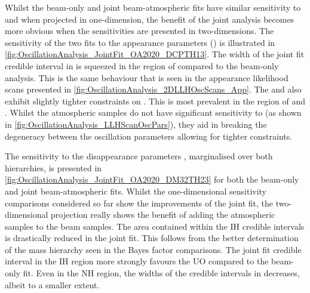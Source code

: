 Whilst the beam-only and joint beam-atmospheric fits have similar sensitivity to  and  when projected in one-dimension, the benefit of the joint analysis becomes more obvious when the sensitivities are presented in two-dimensions. The sensitivity of the two fits to the appearance parameters () is illustrated in \autoref{fig:OscillationAnalysis_JointFit_OA2020_DCPTH13}. The width of the  joint fit credible interval in  is squeezed in the region of  compared to the beam-only analysis. This is the same behaviour that is seen in the appearance likelihood scans presented in \autoref{fig:OscillationAnalysis_2DLLHOscScans_App}. The \quickmath{1\sigma} and  also exhibit slightly tighter constraints on . This is most prevalent in the region of  and . Whilst the atmospheric samples do not have significant sensitivity to  (as shown in \autoref{fig:OscillationAnalysis_LLHScanOscPars}), they aid in breaking the degeneracy between the oscillation parameters allowing for tighter constraints.

The sensitivity to the disappearance parameters , marginalised over both hierarchies, is presented in \autoref{fig:OscillationAnalysis_JointFit_OA2020_DM32TH23} for both the beam-only and joint beam-atmospheric fits. Whilst the one-dimensional sensitivity comparisons considered so far show the improvements of the joint fit, the two-dimensional projection really shows the benefit of adding the atmospheric samples to the beam samples. The area contained within the IH credible intervals is drastically reduced in the joint fit. This follows from the better determination of the mass hierarchy seen in the Bayes factor comparisons. The \quickmath{1\sigma} joint fit credible interval in the IH region more strongly favours the UO compared to the beam-only fit. Even in the NH region, the widths of the credible intervals in  decreases, albeit to a smaller extent.

